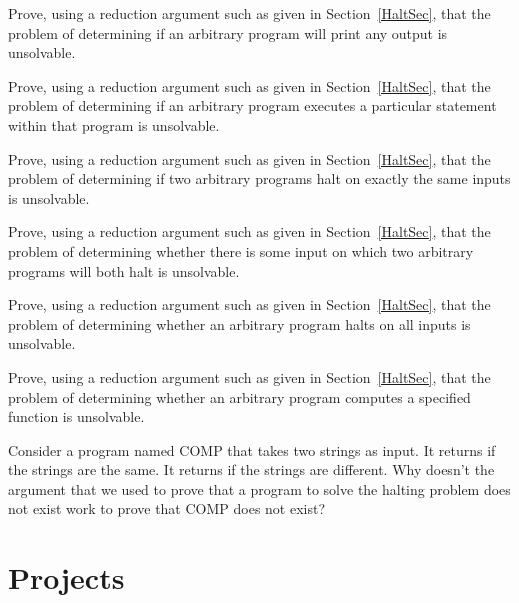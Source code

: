 \begin{exercises}
\item
Prove, using a reduction argument such as given in
Section~\ref{HaltSec}, that the problem of determining if an arbitrary
program will print any output is unsolvable.

\item
Prove, using a reduction argument such as given in
Section~\ref{HaltSec}, that the problem of determining if an arbitrary
program executes a particular statement within that program is
unsolvable.

\item
Prove, using a reduction argument such as given in
Section~\ref{HaltSec}, that the problem of determining if two
arbitrary  programs halt on exactly the same inputs is unsolvable.

\item
Prove, using a reduction argument such as given in
Section~\ref{HaltSec}, that the problem of determining whether there
is some input on which two arbitrary programs will both
halt is unsolvable.

\item
Prove, using a reduction argument such as given in
Section~\ref{HaltSec}, that the problem of determining whether an
arbitrary program halts on all inputs is unsolvable.

\item
Prove, using a reduction argument such as given in
Section~\ref{HaltSec}, that the problem of determining whether an
arbitrary program computes a specified function is unsolvable.

\item
Consider a program named COMP that takes two strings as input.
It returns  if the strings are the same.
It returns  if the strings are different.
Why doesn't the argument that we used to prove that a program to solve
the halting problem does not exist work to prove that COMP does not
exist?
\end{exercises}

\section{Projects}

